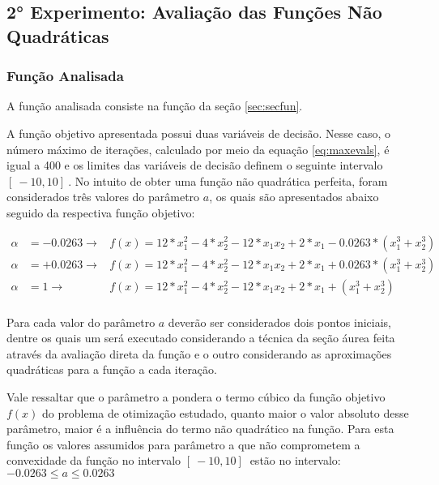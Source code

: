 

\subsection{2° Experimento: Avaliação das Funções Não Quadráticas}
    \subsubsection{Função Analisada}

    A função analisada consiste na função da seção \ref{sec:secfun}.

    A função objetivo apresentada possui duas variáveis de decisão. Nesse caso, o número máximo de iterações, calculado por meio da equação \ref{eq:maxevals}, é igual a 400 e os limites das variáveis de decisão definem o seguinte intervalo $[\ -10 , 10 ]\ $. No intuito de obter uma função não quadrática perfeita, foram considerados três valores do parâmetro $a$, os quais são apresentados abaixo seguido da respectiva função objetivo:

    \begin{equation*}   
        \begin{aligned}
            \alpha &=-0.0263 \rightarrow &f(x) = 12*x_1^2 - 4*x_2^2 - 12*x_1x_2 + 2*x_1 -0.0263*(x_1^3+x_2^3)\\
            \alpha &=+0.0263 \rightarrow &f(x) = 12*x_1^2 - 4*x_2^2 - 12*x_1x_2 + 2*x_1 + 0.0263*(x_1^3+x_2^3)\\
            \alpha &=1 \rightarrow &f(x) = 12*x_1^2 - 4*x_2^2 - 12*x_1x_2 + 2*x_1 + (x_1^3+x_2^3)\\   
        \end{aligned}
    \end{equation*}
 
    Para cada valor do parâmetro $a$ deverão ser considerados dois pontos iniciais, dentre os quais um será executado considerando a técnica da seção áurea feita através da avaliação direta da função e o outro considerando as aproximações quadráticas para a função a cada iteração.

    Vale ressaltar que o parâmetro a pondera o termo cúbico da função objetivo $f(x)$ do problema de otimização estudado, quanto maior o valor absoluto desse parâmetro, maior é a influência do termo não quadrático na função. Para esta função os valores assumidos para parâmetro  a que não comprometem a convexidade da função   no intervalo $[\ -10 , 10 ]\ $ estão no intervalo: \\ {\centering $-0.0263 \leq a \leq 0.0263$} \\
    \vspace{2mm}

